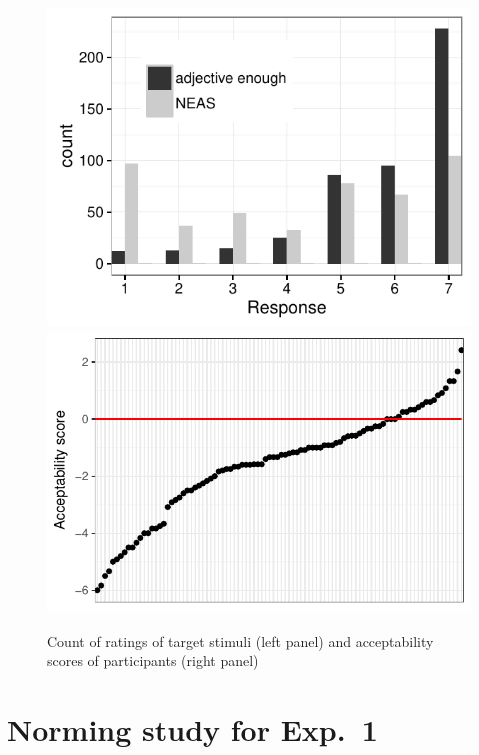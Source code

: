 \documentclass[11pt,fleqn]{article}
\newcommand{\6}{\mbox{$[\hspace*{-.6mm}[$}}
\newcommand{\9}{\mbox{$]\hspace*{-.6mm}]$}}
\begin{document}
\begin{figure}[h!]

\hspace*{-.5cm}\includegraphics[scale=.8]{../acceptability-rating-study/graphs/histogram} \includegraphics[scale=.8]{../acceptability-rating-study/graphs/acceptability-rating-difference}


\caption{Count of ratings of target stimuli (left panel) and acceptability scores of participants (right panel)}\label{f-acc}

\end{figure}

\section{Norming study for Exp.~1}\label{a-norming}
\end{document}

